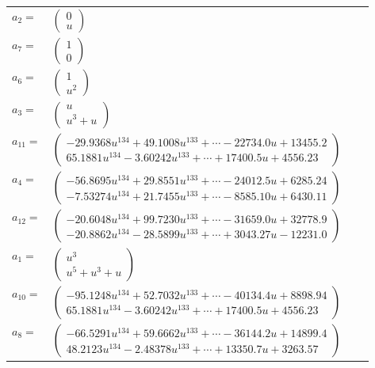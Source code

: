 \documentclass[1p]{elsarticle_modified}
\theoremstyle{definition}
\begin{document}
\begin{tabular}{m{7pt} m{180pt} m{7pt} m{180pt} }
\flushright $a_{2}=$&$\begin{pmatrix}0\\u\end{pmatrix}$ \\
\flushright $a_{7}=$&$\begin{pmatrix}1\\0\end{pmatrix}$ \\
\flushright $a_{6}=$&$\begin{pmatrix}1\\u^2\end{pmatrix}$ \\
\flushright $a_{3}=$&$\begin{pmatrix}u\\u^3+u\end{pmatrix}$ \\
\flushright $a_{11}=$&$\begin{pmatrix}-29.9368 u^{134}+49.1008 u^{133}+\cdots-22734.0 u+13455.2\\65.1881 u^{134}-3.60242 u^{133}+\cdots+17400.5 u+4556.23\end{pmatrix}$ \\
\flushright $a_{4}=$&$\begin{pmatrix}-56.8695 u^{134}+29.8551 u^{133}+\cdots-24012.5 u+6285.24\\-7.53274 u^{134}+21.7455 u^{133}+\cdots-8585.10 u+6430.11\end{pmatrix}$ \\
\flushright $a_{12}=$&$\begin{pmatrix}-20.6048 u^{134}+99.7230 u^{133}+\cdots-31659.0 u+32778.9\\-20.8862 u^{134}-28.5899 u^{133}+\cdots+3043.27 u-12231.0\end{pmatrix}$ \\
\flushright $a_{1}=$&$\begin{pmatrix}u^3\\u^5+u^3+u\end{pmatrix}$ \\
\flushright $a_{10}=$&$\begin{pmatrix}-95.1248 u^{134}+52.7032 u^{133}+\cdots-40134.4 u+8898.94\\65.1881 u^{134}-3.60242 u^{133}+\cdots+17400.5 u+4556.23\end{pmatrix}$ \\
\flushright $a_{8}=$&$\begin{pmatrix}-66.5291 u^{134}+59.6662 u^{133}+\cdots-36144.2 u+14899.4\\48.2123 u^{134}-2.48378 u^{133}+\cdots+13350.7 u+3263.57\end{pmatrix}$ \\

\end{tabular}
\end{document}
